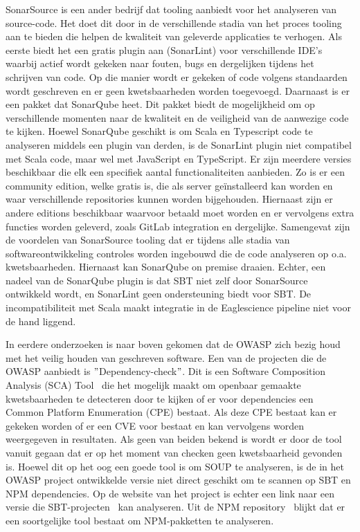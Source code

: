 SonarSource is een ander bedrijf dat tooling aanbiedt voor het analyseren van source-code. Het doet dit door in de verschillende stadia van het proces tooling aan te bieden die helpen de kwaliteit van geleverde applicaties te verhogen. Als eerste biedt het een gratis plugin aan (SonarLint) voor verschillende IDE's waarbij actief wordt gekeken naar fouten, bugs en dergelijken tijdens het schrijven van code. Op die manier wordt er gekeken of code volgens standaarden wordt geschreven en er geen kwetsbaarheden worden toegevoegd. Daarnaast is er een pakket dat SonarQube heet. Dit pakket biedt de mogelijkheid om op verschillende momenten naar de kwaliteit en de veiligheid van de aanwezige code te kijken. Hoewel SonarQube geschikt is om Scala en Typescript code te analyseren middels een plugin van derden, is de SonarLint plugin niet compatibel met Scala code, maar wel met JavaScript en TypeScript. Er zijn meerdere versies beschikbaar die elk een specifiek aantal functionaliteiten aanbieden. Zo is er een community edition, welke gratis is, die als server geïnstalleerd kan worden en waar verschillende repositories kunnen worden bijgehouden. Hiernaast zijn er andere editions beschikbaar waarvoor betaald moet worden en er vervolgens extra functies worden geleverd, zoals GitLab integration en dergelijke. Samengevat zijn de voordelen van SonarSource tooling dat er tijdens alle stadia van softwareontwikkeling controles worden ingebouwd die de code analyseren op o.a. kwetsbaarheden. Hiernaast kan SonarQube on premise draaien. Echter, een nadeel van de SonarQube plugin is dat SBT niet zelf door SonarSource ontwikkeld wordt, en SonarLint geen ondersteuning biedt voor SBT. De incompatibiliteit met Scala maakt integratie in de Eaglescience pipeline niet voor de hand liggend.

In eerdere onderzoeken is naar boven gekomen dat de OWASP zich bezig houd met het veilig houden van geschreven software. Een van de projecten die de OWASP aanbiedt is $"$Dependency-check$"$. Dit is een Software Composition Analysis (SCA) Tool~\citep{OWASP:2017} die het mogelijk maakt om openbaar gemaakte kwetsbaarheden te detecteren door te kijken of er voor dependencies een Common Platform Enumeration (CPE) bestaat. Als deze CPE bestaat kan er gekeken worden of er een CVE voor bestaat en kan vervolgens worden weergegeven in resultaten. Als geen van beiden bekend is wordt er door de tool vanuit gegaan dat er op het moment van checken geen kwetsbaarheid gevonden is. Hoewel dit op het oog een goede tool is om SOUP te analyseren, is de in het OWASP project ontwikkelde versie niet direct geschikt om te scannen op SBT en NPM dependencies. Op de website van het project is echter een link naar een versie die SBT-projecten~\citep{Albuch:z.d.} kan analyseren. Uit de NPM repository~\citep{npm:z.d.} blijkt dat er een soortgelijke tool bestaat om NPM-pakketten te analyseren.

